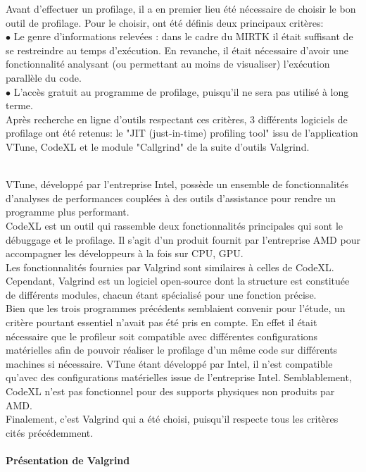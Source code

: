 \documentclass[10pt]{report}
\begin{document}
Avant d'effectuer un profilage, il a en premier lieu été nécessaire de choisir le bon outil de profilage. Pour le choisir, ont été définis deux principaux critères:\\
{$\bullet$} Le genre d'informations relevées : dans le cadre du MIRTK il était suffisant de se restreindre au temps d'exécution. En revanche, il était nécessaire d'avoir une fonctionnalité analysant (ou permettant au moins de visualiser) l'exécution parallèle du code. \\
{$\bullet$} L'accès gratuit au programme de profilage, puisqu'il ne sera pas utilisé à long terme.\\
Après recherche en ligne d'outils respectant ces critères, 3 différents logiciels de profilage ont été retenus: le "JIT (just-in-time) profiling tool" issu de l'application VTune, CodeXL et le module "Callgrind" de la suite d'outils Valgrind.\\~\par
\noindent VTune, développé par l'entreprise Intel, possède un ensemble de fonctionnalités d'analyses de performances couplées à des outils d'assistance pour rendre un programme plus performant. \\
CodeXL est un outil qui rassemble deux fonctionnalités principales qui sont le débuggage et le profilage. Il s'agit d'un produit fournit par l'entreprise AMD pour accompagner les développeurs à la fois sur CPU, GPU.
\\Les fonctionnalités fournies par Valgrind sont similaires à celles de CodeXL. Cependant, Valgrind est un logiciel open-source dont la structure est constituée de différents modules, chacun étant spécialisé pour une fonction précise.\\

Bien que les trois programmes précédents semblaient convenir pour l'étude, un critère pourtant essentiel n'avait pas été pris en compte. En effet il était nécessaire que le profileur soit compatible avec différentes configurations matérielles afin de pouvoir réaliser le profilage d'un même code sur différents machines si nécessaire. VTune étant développé par Intel, il n'est compatible qu'avec des configurations matérielles issue de l'entreprise Intel. Semblablement, CodeXL n'est pas fonctionnel pour des supports physiques non produits par AMD.\\

Finalement, c'est Valgrind qui a été choisi, puisqu'il respecte tous les critères cités précédemment.
 \\
 \paragraph{Présentation de Valgrind}~\par
\end{document}
